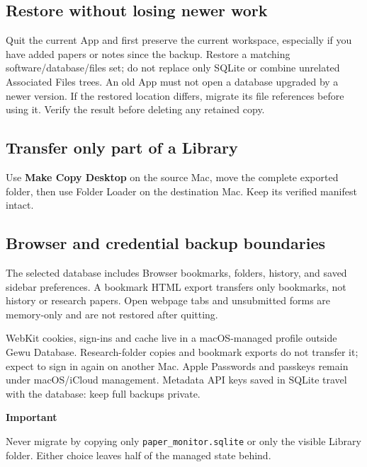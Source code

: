 \documentclass[10pt,letterpaper,oneside]{scrreprt}
\renewenvironment{quote}
  {\Needspace{5\baselineskip}\begin{tcolorbox}[enhanced,breakable,colback=GewuPale,colframe=GewuPale,boxrule=0pt,
    borderline west={1.6pt}{0pt}{GewuBlue},arc=1.2mm,left=2.5mm,right=2.5mm,top=1.7mm,bottom=1.7mm,
    before skip=4pt,after skip=5pt,fontupper=\color{GewuInk}\small]}
  {\end{tcolorbox}}
\begin{document}
\subsection{Restore without losing newer work}\label{restore-workspace}

Quit the current App and first preserve the current workspace, especially if you have added papers or notes since the backup. Restore a matching software/database/files set; do not replace only SQLite or combine unrelated Associated Files trees. An old App must not open a database upgraded by a newer version. If the restored location differs, migrate its file references before using it. Verify the result before deleting any retained copy.

\subsection{Transfer only part of a Library}\label{transfer-only-part-of-a-library}

Use \textbf{Make Copy Desktop} on the source Mac, move the complete exported folder, then use Folder Loader on the destination Mac. Keep its verified manifest intact.

\subsection{Browser and credential backup boundaries}\label{browser-and-credential-backup-boundaries}

The selected database includes Browser bookmarks, folders, history, and saved sidebar preferences. A bookmark HTML export transfers only bookmarks, not history or research papers. Open webpage tabs and unsubmitted forms are memory-only and are not restored after quitting.

WebKit cookies, sign-ins and cache live in a macOS-managed profile outside Gewu Database. Research-folder copies and bookmark exports do not transfer it; expect to sign in again on another Mac. Apple Passwords and passkeys remain under macOS/iCloud management. Metadata API keys saved in SQLite travel with the database: keep full backups private.

\begin{quote}
\textbf{Important}

Never migrate by copying only \texttt{paper\_monitor.sqlite} or only the visible Library folder. Either choice leaves half of the managed state behind.
\end{quote}
\end{document}
